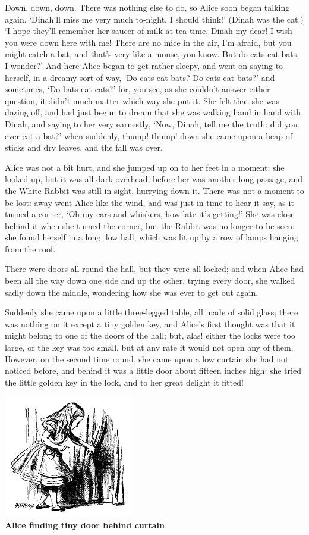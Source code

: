 \documentclass{article}
\begin{document}
Down, down, down. There was nothing else to do, so Alice soon began talking again. `Dinah'll miss me very much to-night, I should think!' (Dinah was the cat.) `I hope they'll remember her saucer of milk at tea-time. Dinah my dear! I wish you were down here with me! There are no mice in the air, I'm afraid, but you might catch a bat, and that's very like a mouse, you know. But do cats eat bats, I wonder?' And here Alice began to get rather sleepy, and went on saying to herself, in a dreamy sort of way, `Do cats eat bats? Do cats eat bats?' and sometimes, `Do bats eat cats?' for, you see, as she couldn't answer either question, it didn't much matter which way she put it. She felt that she was dozing off, and had just begun to dream that she was walking hand in hand with Dinah, and saying to her very earnestly, `Now, Dinah, tell me the truth: did you ever eat a bat?' when suddenly, thump! thump! down she came upon a heap of sticks and dry leaves, and the fall was over.

Alice was not a bit hurt, and she jumped up on to her feet in a moment: she looked up, but it was all dark overhead; before her was another long passage, and the White Rabbit was still in sight, hurrying down it. There was not a moment to be lost: away went Alice like the wind, and was just in time to hear it say, as it turned a corner, `Oh my ears and whiskers, how late it's getting!' She was close behind it when she turned the corner, but the Rabbit was no longer to be seen: she found herself in a long, low hall, which was lit up by a row of lamps hanging from the roof.

There were doors all round the hall, but they were all locked; and when Alice had been all the way down one side and up the other, trying every door, she walked sadly down the middle, wondering how she was ever to get out again.

Suddenly she came upon a little three-legged table, all made of solid glass; there was nothing on it except a tiny golden key, and Alice's first thought was that it might belong to one of the doors of the hall; but, alas! either the locks were too large, or the key was too small, but at any rate it would not open any of them. However, on the second time round, she came upon a low curtain she had not noticed before, and behind it was a little door about fifteen inches high: she tried the little golden key in the lock, and to her great delight it fitted!

\begin{center}
    \includegraphics{TinyDoor}\\
    \textbf{Alice finding tiny door behind curtain\\}
\end{center}
\end{document}
